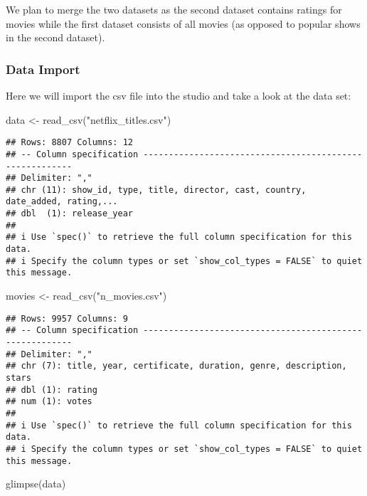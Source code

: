 \documentclass[
]{article}
\newenvironment{Shaded}{\begin{snugshade}}{\end{snugshade}}
\newcommand{\FunctionTok}[1]{\textcolor[rgb]{0.00,0.00,0.00}{#1}}
\newcommand{\NormalTok}[1]{#1}
\newcommand{\OtherTok}[1]{\textcolor[rgb]{0.56,0.35,0.01}{#1}}
\newcommand{\StringTok}[1]{\textcolor[rgb]{0.31,0.60,0.02}{#1}}
\begin{document}
We plan to merge the two datasets as the second dataset contains ratings
for movies while the first dataset consists of all movies (as opposed to
popular shows in the second dataset).

\hypertarget{data-import}{%
\subsubsection{Data Import}\label{data-import}}

Here we will import the csv file into the studio and take a look at the
data set:

\begin{Shaded}
\begin{Highlighting}[]
\NormalTok{data }\OtherTok{\textless{}{-}} \FunctionTok{read\_csv}\NormalTok{(}\StringTok{"netflix\_titles.csv"}\NormalTok{) }
\end{Highlighting}
\end{Shaded}

\begin{verbatim}
## Rows: 8807 Columns: 12
## -- Column specification --------------------------------------------------------
## Delimiter: ","
## chr (11): show_id, type, title, director, cast, country, date_added, rating,...
## dbl  (1): release_year
## 
## i Use `spec()` to retrieve the full column specification for this data.
## i Specify the column types or set `show_col_types = FALSE` to quiet this message.
\end{verbatim}

\begin{Shaded}
\begin{Highlighting}[]
\NormalTok{movies }\OtherTok{\textless{}{-}} \FunctionTok{read\_csv}\NormalTok{(}\StringTok{"n\_movies.csv"}\NormalTok{)}
\end{Highlighting}
\end{Shaded}

\begin{verbatim}
## Rows: 9957 Columns: 9
## -- Column specification --------------------------------------------------------
## Delimiter: ","
## chr (7): title, year, certificate, duration, genre, description, stars
## dbl (1): rating
## num (1): votes
## 
## i Use `spec()` to retrieve the full column specification for this data.
## i Specify the column types or set `show_col_types = FALSE` to quiet this message.
\end{verbatim}

\begin{Shaded}
\begin{Highlighting}[]
\FunctionTok{glimpse}\NormalTok{(data)}
\end{Highlighting}
\end{Shaded}
\end{document}
